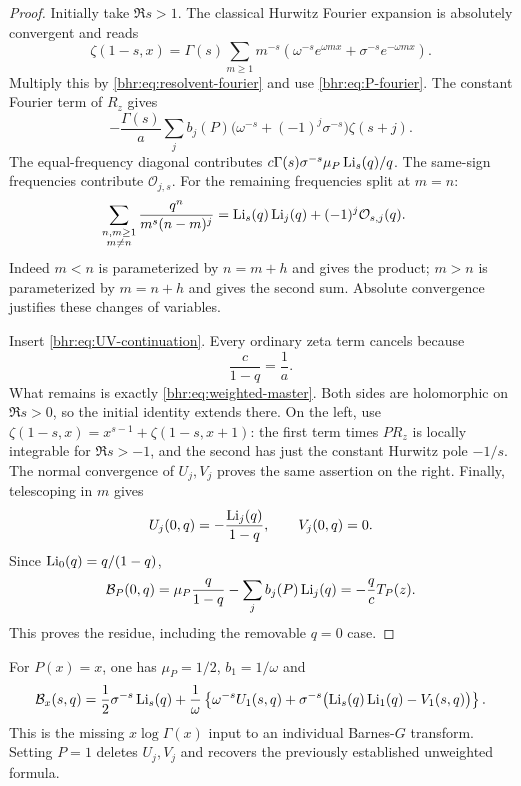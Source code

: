\begin{proof}
Initially take $\Re s>1$. The classical Hurwitz Fourier expansion
\cite[\S25.11]{bhr:DLMFZ} is absolutely convergent and reads
\begin{equation}\label{bhr:eq:hurwitz-fourier}
 \zeta(1-s,x)=\Gamma(s)\sum_{m\ge1}m^{-s}
       \left(\omega^{-s}e^{\omega mx}
                         +\sigma^{-s}e^{-\omega mx}\right).
\end{equation}
Multiply this by \eqref{bhr:eq:resolvent-fourier} and use
\eqref{bhr:eq:P-fourier}. The constant Fourier term of $R_z$ gives
\[
 -\frac{\Gamma(s)}a\sum_j b_j(P)
        \bigl(\omega^{-s}+(-1)^j\sigma^{-s}\bigr)\zeta(s+j).
\]
The equal-frequency diagonal contributes
$c\Gamma(s)\sigma^{-s}\mu_P\operatorname{Li}_s(q)/q$.
The same-sign frequencies contribute $\mathcal O_{j,s}$.
For the remaining frequencies split at $m=n$:
\begin{align}\label{bhr:eq:lattice-splitting}
 \sum_{\substack{n,m\ge1\\m\ne n}}
    \frac{q^n}{m^s(n-m)^j}
 &=\operatorname{Li}_s(q)\operatorname{Li}_j(q)+(-1)^j\mathcal O_{s,j}(q).
\end{align}
Indeed $m<n$ is parameterized by $n=m+h$ and gives the
product; $m>n$ is parameterized by $m=n+h$ and gives the second
sum. Absolute convergence justifies these changes of variables.

Insert \eqref{bhr:eq:UV-continuation}. Every ordinary zeta term
cancels because
\begin{equation}\label{bhr:eq:coefficient-cancellation}
 \frac{c}{1-q}=\frac1a.
\end{equation}
What remains is exactly \eqref{bhr:eq:weighted-master}.
Both sides are holomorphic on $\Re s>0$, so the initial identity
extends there. On the left, use
$\zeta(1-s,x)=x^{s-1}+\zeta(1-s,x+1)$:
the first term times $P R_z$ is locally integrable for $\Re s>-1$,
and the second has just the constant Hurwitz pole $-1/s$.
The normal convergence of $U_j,V_j$ proves the same assertion
on the right. Finally, telescoping in $m$ gives
\[
 U_j(0,q)=-\frac{\operatorname{Li}_j(q)}{1-q},\qquad V_j(0,q)=0.
\]
Since $\operatorname{Li}_0(q)=q/(1-q)$,
\begin{equation}\label{bhr:eq:Bzero}
 \mathcal B_P(0,q)=\mu_P\frac{q}{1-q}
                     -\sum_jb_j(P)\operatorname{Li}_j(q)=-\frac q c T_P(z).
\end{equation}
This proves the residue, including the removable $q=0$ case.
\end{proof}

\begin{example}\label{bhr:ex:xweight}
For $P(x)=x$, one has $\mu_P=1/2$, $b_1=1/\omega$ and
\begin{align}
 \mathcal B_x(s,q)
  =\frac12\sigma^{-s}\operatorname{Li}_s(q)
   +\frac1\omega\left\{\omega^{-s}U_1(s,q)
       +\sigma^{-s}\bigl(\operatorname{Li}_s(q)\operatorname{Li}_1(q)-V_1(s,q)\bigr)\right\}.
 \label{bhr:eq:xweight}
\end{align}
This is the missing $x\log\Gamma(x)$ input to an individual
Barnes-$G$ transform. Setting $P=1$ deletes $U_j,V_j$ and
recovers the previously established unweighted formula.
\end{example}

